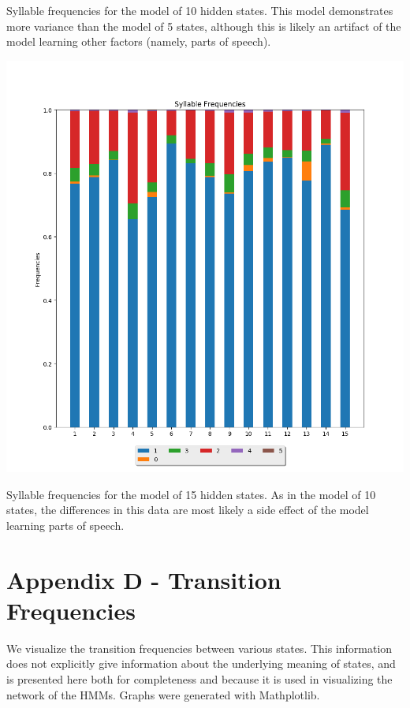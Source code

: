 Syllable frequencies for the model of 10 hidden states. This model demonstrates more variance than the model of 5 states, although this is likely an artifact of the model learning other factors (namely, parts of speech).

\begin{center}
\includegraphics[scale=0.6]{../src/results/syllables_15}
\end{center}

Syllable frequencies for the model of 15 hidden states. As in the model of 10 states, the differences in this data are most likely a side effect of the model learning parts of speech.

\pagebreak
\section{Appendix D - Transition Frequencies}
We visualize the transition frequencies between various states. This information does not explicitly give information about the underlying meaning of states, and is presented here both for completeness and because it is used in visualizing the network of the HMMs. Graphs were generated with Mathplotlib.

